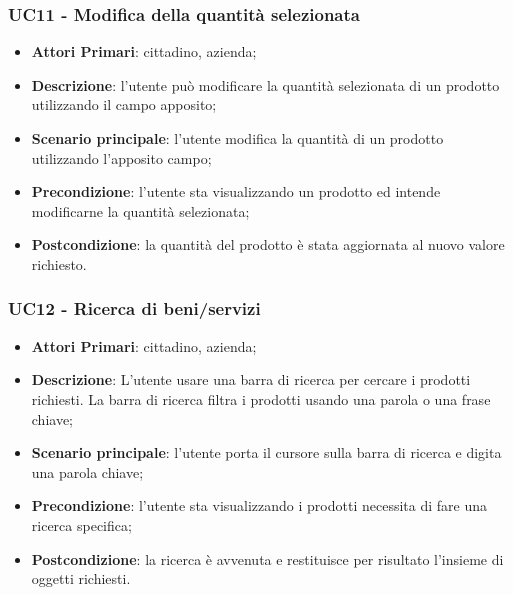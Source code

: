  \subsubsection{UC11 - Modifica della quantità selezionata}
 \begin{itemize}
 	\item \textbf{Attori Primari}: cittadino, azienda;
 	\item \textbf{Descrizione}: l'utente può modificare la quantità selezionata di un prodotto utilizzando il campo apposito;
 	\item \textbf{Scenario principale}: l'utente modifica la quantità di un prodotto utilizzando l'apposito campo;
 	\item \textbf{Precondizione}: l'utente sta visualizzando un prodotto ed intende modificarne la quantità selezionata;
 	\item \textbf{Postcondizione}: la quantità del prodotto è stata aggiornata al nuovo valore richiesto.
 \end{itemize}

 \subsubsection{UC12 - Ricerca di beni/servizi}
\begin{itemize}
	\item \textbf{Attori Primari}: cittadino, azienda;
	\item \textbf{Descrizione}: L'utente usare una barra di ricerca per cercare i prodotti richiesti. La barra di ricerca filtra i prodotti usando una parola o una frase chiave;
	\item \textbf{Scenario principale}: l'utente porta il cursore sulla barra di ricerca e digita una parola chiave;
	\item \textbf{Precondizione}: l'utente sta visualizzando i prodotti necessita di fare una ricerca specifica;
	\item \textbf{Postcondizione}: la ricerca è avvenuta e restituisce per risultato l'insieme di oggetti richiesti.
\end{itemize}